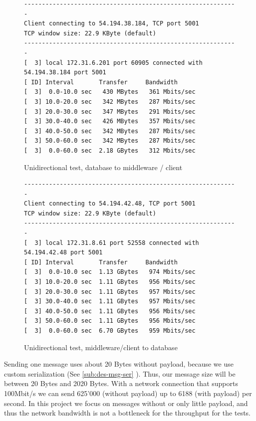 \documentclass[milestone1.tex]{subfiles}
\begin{document}
\begin{figure}[H]
\begin{center}
\begin{verbatim}
------------------------------------------------------------
Client connecting to 54.194.38.184, TCP port 5001
TCP window size: 22.9 KByte (default)
------------------------------------------------------------
[  3] local 172.31.6.201 port 60905 connected with 54.194.38.184 port 5001
[ ID] Interval       Transfer     Bandwidth
[  3]  0.0-10.0 sec   430 MBytes   361 Mbits/sec
[  3] 10.0-20.0 sec   342 MBytes   287 Mbits/sec
[  3] 20.0-30.0 sec   347 MBytes   291 Mbits/sec
[  3] 30.0-40.0 sec   426 MBytes   357 Mbits/sec
[  3] 40.0-50.0 sec   342 MBytes   287 Mbits/sec
[  3] 50.0-60.0 sec   342 MBytes   287 Mbits/sec
[  3]  0.0-60.0 sec  2.18 GBytes   312 Mbits/sec
\end{verbatim}
\end{center}
\caption{Unidirectional test, database to middleware / client}
\label{fig:iperfserver}
\end{figure}


\begin{figure}[H]
\begin{center}
\begin{verbatim}
------------------------------------------------------------
Client connecting to 54.194.42.48, TCP port 5001
TCP window size: 22.9 KByte (default)
------------------------------------------------------------
[  3] local 172.31.8.61 port 52558 connected with 54.194.42.48 port 5001
[ ID] Interval       Transfer     Bandwidth
[  3]  0.0-10.0 sec  1.13 GBytes   974 Mbits/sec
[  3] 10.0-20.0 sec  1.11 GBytes   956 Mbits/sec
[  3] 20.0-30.0 sec  1.11 GBytes   957 Mbits/sec
[  3] 30.0-40.0 sec  1.11 GBytes   957 Mbits/sec
[  3] 40.0-50.0 sec  1.11 GBytes   956 Mbits/sec
[  3] 50.0-60.0 sec  1.11 GBytes   956 Mbits/sec
[  3]  0.0-60.0 sec  6.70 GBytes   959 Mbits/sec

\end{verbatim}
\end{center}
\caption{Unidirectional test, middleware/client to database}
\label{fig:iperfserver2}
\end{figure}

Sending one message uses about 20 Bytes without payload, because we use custom serialization (See \ref{sub:des-msg-ser} ). Thus, our message size will be between 20 Bytes and 2020 Bytes. With a network connection that supports 100Mbit/s we can send 625'000 (without payload) up to 6188 (with payload) per second. In this project we focus on messages without or only little payload, and thus the network bandwidth is not a bottleneck for the throughput for the tests.
\end{document}

